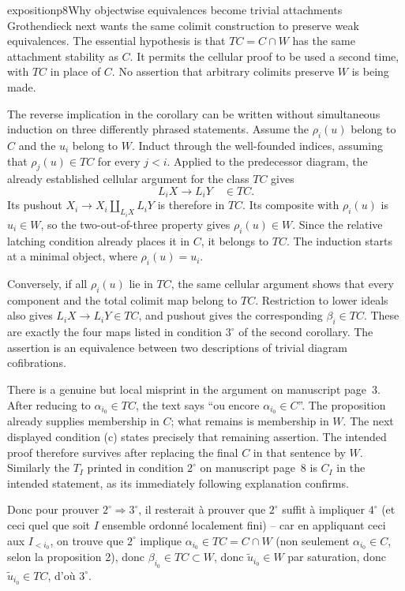 \begin{dcomment}{exposition}{p8}{Why objectwise equivalences become trivial attachments}
Grothendieck next wants the same colimit construction to preserve weak equivalences. The essential hypothesis is that $TC=C\cap W$ has the same attachment stability as $C$. It permits the cellular proof to be used a second time, with $TC$ in place of $C$. No assertion that arbitrary colimits preserve $W$ is being made.

The reverse implication in the corollary can be written without simultaneous induction on three differently phrased statements. Assume the $\rho_i(u)$ belong to $C$ and the $u_i$ belong to $W$. Induct through the well-founded indices, assuming that $\rho_j(u)\in TC$ for every $j<i$. Applied to the predecessor diagram, the already established cellular argument for the class $TC$ gives
\[
 L_iX\longrightarrow L_iY\quad\in TC.
\]
Its pushout $X_i\to X_i\amalg_{L_iX}L_iY$ is therefore in $TC$. Its composite with $\rho_i(u)$ is $u_i\in W$, so the two-out-of-three property gives $\rho_i(u)\in W$. Since the relative latching condition already places it in $C$, it belongs to $TC$. The induction starts at a minimal object, where $\rho_i(u)=u_i$.

Conversely, if all $\rho_i(u)$ lie in $TC$, the same cellular argument shows that every component and the total colimit map belong to $TC$. Restriction to lower ideals also gives $L_iX\to L_iY\in TC$, and pushout gives the corresponding $\beta_i\in TC$. These are exactly the four maps listed in condition $3^\circ$ of the second corollary. The assertion is an equivalence between two descriptions of trivial diagram cofibrations.

There is a genuine but local misprint in the argument on manuscript page~3. After reducing to $\alpha_{i_0}\in TC$, the text says ``ou encore $\alpha_{i_0}\in C$''. The proposition already supplies membership in $C$; what remains is membership in $W$. The next displayed condition (c) states precisely that remaining assertion. The intended proof therefore survives after replacing the final $C$ in that sentence by $W$. Similarly the $T_I$ printed in condition $2^\circ$ on manuscript page~8 is $C_I$ in the intended statement, as its immediately following explanation confirms.
\end{dcomment}


Donc pour prouver $2^{\circ} \Longrightarrow 3^{\circ}$, il resterait à prouver que $2^{\circ}$ suffit à impliquer $4^{\circ}$ (et ceci quel que soit $I$ ensemble ordonné localement fini) -- car en appliquant ceci aux $I_{<i_0}$, on trouve que $2^{\circ}$ implique $\alpha_{i_0} \in TC = C \cap W$ (non seulement $\alpha_{i_0} \in C$, selon la proposition 2), donc $\beta_{i_0} \in TC \subset W$, donc $\tilde{u}_{i_0} \in W$ par saturation, donc $\tilde{u}_{i_0} \in TC$, d'où $3^{\circ}$.

